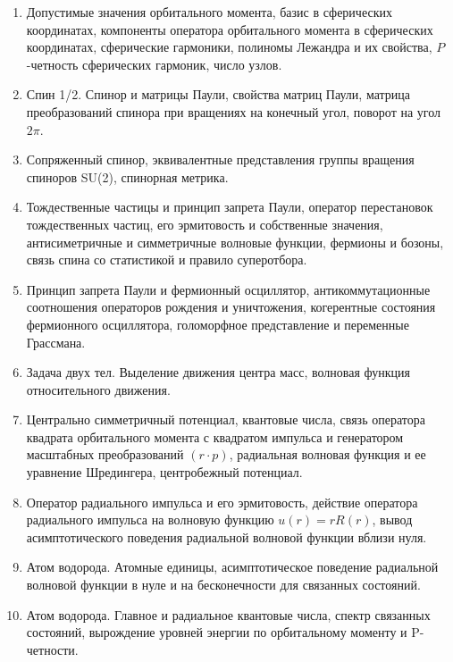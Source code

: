 \begin{enumerate}
\item Допустимые значения орбитального момента, базис в сферических координатах, компоненты оператора орбитального момента в сферических координатах, сферические гармоники, полиномы Лежандра и их свойства, $P$-четность сферических гармоник, число узлов.

\item Спин 1/2. Спинор и матрицы Паули, свойства матриц Паули, матрица
преобразований спинора при вращениях на конечный угол, поворот на
угол $2 \pi$.

\item Сопряженный спинор, эквивалентные представления группы вращения
спиноров SU(2), спинорная метрика.

\item Тождественные частицы и принцип запрета Паули, оператор перестановок тождественных частиц, его эрмитовость и собственные значения, антисиметричные и симметричные волновые функции, фермионы и бозоны, связь спина со статистикой и правило суперотбора.

\item Принцип запрета Паули и фермионный осциллятор, антикоммутационные соотношения операторов рождения и уничтожения, когерентные состояния фермионного осциллятора, голоморфное представление и переменные Грассмана.

\item Задача двух тел. Выделение движения центра масс, волновая функция относительного движения.

\item Центрально симметричный потенциал, квантовые числа, связь оператора квадрата орбитального момента с квадратом импульса и генератором масштабных преобразований $(r \cdot p)$, радиальная волновая функция и ее
уравнение Шредингера, центробежный потенциал.

\item Оператор радиального импульса и его эрмитовость, действие оператора радиального импульса на волновую функцию $u(r) = r R(r)$, вывод асимптотического поведения радиальной волновой функции вблизи нуля.

\item Атом водорода. Атомные единицы, асимптотическое поведение радиальной волновой функции в нуле и на бесконечности для связанных состояний.

\item Атом водорода. Главное и радиальное квантовые числа, спектр связанных состояний, вырождение уровней энергии по орбитальному моменту и P-четности.


\end{enumerate}
